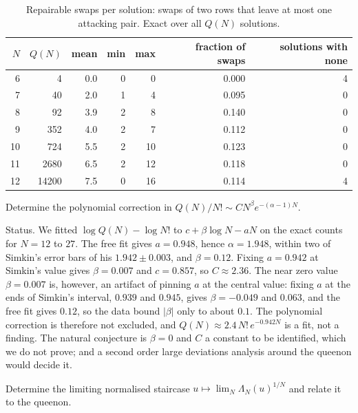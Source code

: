 \begin{table}[t]
\centering
\small
\caption{Repairable swaps per solution: swaps of two rows that leave at most one attacking pair. Exact over all $Q(N)$ solutions.}
\label{tab:repair}
\begin{tabular}{rrrrrrr}
\toprule
$N$ & $Q(N)$ & mean & min & max & fraction of swaps & solutions with none \\
\midrule
6 & 4 & 0.0 & 0 & 0 & 0.000 & 4 \\
7 & 40 & 2.0 & 1 & 4 & 0.095 & 0 \\
8 & 92 & 3.9 & 2 & 8 & 0.140 & 0 \\
9 & 352 & 4.0 & 2 & 7 & 0.112 & 0 \\
10 & 724 & 5.5 & 2 & 10 & 0.123 & 0 \\
11 & 2680 & 6.5 & 2 & 12 & 0.118 & 0 \\
12 & 14200 & 7.5 & 0 & 16 & 0.114 & 4 \\
\bottomrule
\end{tabular}
\end{table}

\begin{problem}
Determine the polynomial correction in $Q(N) / N! \sim C N^\beta e^{-(\alpha - 1) N}$.
\end{problem}

Status. We fitted $\log Q(N) - \log N!$ to $c + \beta \log N - a N$ on the exact counts for $N = 12$ to $27$. The free fit gives $a = 0.948$, hence $\alpha = 1.948$, within two of Simkin's error bars of his $1.942 \pm 0.003$, and $\beta = 0.12$. Fixing $a = 0.942$ at Simkin's value gives $\beta = 0.007$ and $c = 0.857$, so $C \approx 2.36$. The near zero value $\beta = 0.007$ is, however, an artifact of pinning $a$ at the central value: fixing $a$ at the ends of Simkin's interval, $0.939$ and $0.945$, gives $\beta = -0.049$ and $0.063$, and the free fit gives $0.12$, so the data bound $|\beta|$ only to about $0.1$. The polynomial correction is therefore not excluded, and $Q(N) \approx 2.4 \, N! \, e^{-0.942 N}$ is a fit, not a finding. The natural conjecture is $\beta = 0$ and $C$ a constant to be identified, which we do not prove; and a second order large deviations analysis around the queenon would decide it.

\begin{problem}
Determine the limiting normalised staircase $u \mapsto \lim_N \Lambda_N(u)^{1/N}$ and relate it to the queenon.
\end{problem}

